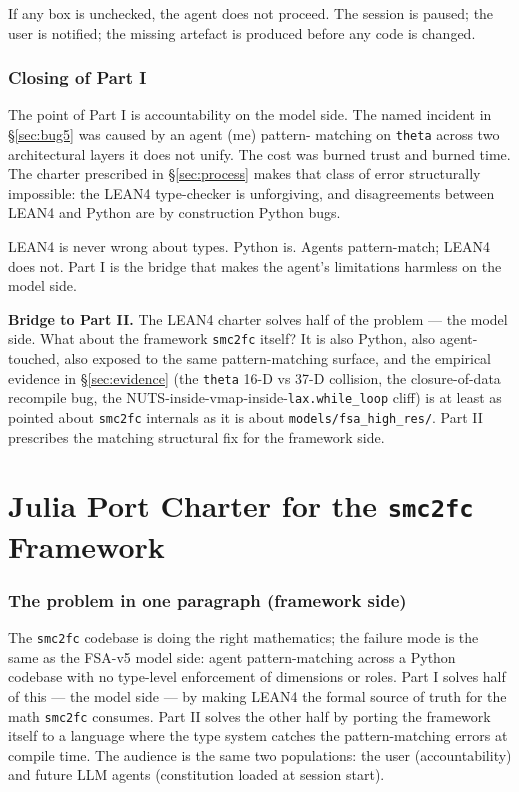 \documentclass[11pt,a4paper]{article}
\begin{document}
If any box is unchecked, the agent does not proceed. The session
is paused; the user is notified; the missing artefact is produced
before any code is changed.

\section{Closing of Part I}
\label{sec:closing-lean4}

The point of Part I is accountability on the model side. The named
incident in §\ref{sec:bug5} was caused by an agent (me) pattern-
matching on \texttt{theta} across two architectural layers it does
not unify. The cost was burned trust and burned time. The charter
prescribed in §\ref{sec:process} makes that class of error
structurally impossible: the LEAN4 type-checker is unforgiving, and
disagreements between LEAN4 and Python are by construction Python
bugs.

LEAN4 is never wrong about types. Python is. Agents pattern-match;
LEAN4 does not. Part I is the bridge that makes the agent's
limitations harmless on the model side.

\textbf{Bridge to Part II.} The LEAN4 charter solves half of the
problem --- the model side. What about the framework
\texttt{smc2fc} itself? It is also Python, also agent-touched,
also exposed to the same pattern-matching surface, and the
empirical evidence in §\ref{sec:evidence} (the \texttt{theta} 16-D
vs 37-D collision, the closure-of-data recompile bug, the
NUTS-inside-vmap-inside-\texttt{lax.while\_loop} cliff) is at least
as pointed about \texttt{smc2fc} internals as it is about
\texttt{models/fsa\_high\_res/}. Part II prescribes the matching
structural fix for the framework side.

\newpage
\part{Julia Port Charter for the \texttt{smc2fc} Framework}
\label{part:julia}

\section{The problem in one paragraph (framework side)}
\label{sec:problem-julia}

The \texttt{smc2fc} codebase is doing the right mathematics; the
failure mode is the same as the FSA-v5 model side: agent
pattern-matching across a Python codebase with no type-level
enforcement of dimensions or roles. Part I solves half of this ---
the model side --- by making LEAN4 the formal source of truth for
the math \texttt{smc2fc} consumes. Part II solves the other half
by porting the framework itself to a language where the type system
catches the pattern-matching errors at compile time. The audience
is the same two populations: the user (accountability) and future
LLM agents (constitution loaded at session start).
\end{document}
